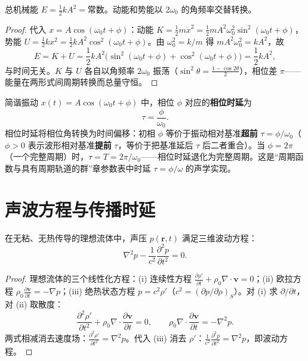 \begin{proposition}[简谐振动的能量守恒]\label{prop:harmonic_energy}
总机械能 $E = \frac{1}{2}kA^2 = \text{常数}$。动能和势能以 $2\omega_0$ 的角频率交替转换。
\end{proposition}

\begin{proof}
代入 $x = A\cos(\omega_0 t + \phi)$：动能 $K = \frac{1}{2}m\dot x^2 = \frac{1}{2}mA^2\omega_0^2\sin^2(\omega_0 t + \phi)$，势能 $U = \frac{1}{2}kx^2 = \frac{1}{2}kA^2\cos^2(\omega_0 t + \phi)$。由 $\omega_0^2 = k/m$ 得 $mA^2\omega_0^2 = kA^2$，故
\[
E = K + U = \frac{1}{2}kA^2\big(\sin^2(\omega_0 t + \phi) + \cos^2(\omega_0 t + \phi)\big) = \frac{1}{2}kA^2,
\]
与时间无关。$K$ 与 $U$ 各自以角频率 $2\omega_0$ 振荡（$\sin^2\theta = \frac{1-\cos 2\theta}{2}$），相位差 $\pi$——能量在两形式间周期转换而总量守恒。
\end{proof}

\begin{definition}[简谐振动的相位时延]\label{def:harmonic_phase_delay}
简谐振动 $x(t) = A\cos(\omega_0 t + \phi)$ 中，相位 $\phi$ 对应的\textbf{相位时延}为
\[
\tau = \frac{\phi}{\omega_0}.
\]
相位时延将相位角转换为时间偏移：初相 $\phi$ 等价于振动相对基准\textbf{超前} $\tau = \phi/\omega_0$（$\phi>0$ 表示波形相对基准\textbf{提前} $\tau$，等价于把基准延后 $\tau$ 后二者重合）。当 $\phi = 2\pi$（一个完整周期）时，$\tau = T = 2\pi/\omega_0$——相位时延退化为完整周期。这是“周期函数与具有周期轨道的群”章参数表中时延 $\tau = \phi/\omega$ 的声学实现。
\end{definition}

\section{声波方程与传播时延}

\begin{theorem}[声波方程]\label{thm:acoustic_wave_equation}
在无粘、无热传导的理想流体中，声压 $p(\mathbf{r}, t)$ 满足三维波动方程：
\[
\boxed{\nabla^2 p - \frac{1}{c^2} \frac{\partial^2 p}{\partial t^2} = 0}.
\]
\end{theorem}

\begin{proof}
理想流体的三个线性化方程：(i) 连续性方程 $\frac{\partial \rho'}{\partial t} + \rho_0 \nabla\cdot\mathbf{v} = 0$；(ii) 欧拉方程 $\rho_0 \frac{\partial \mathbf{v}}{\partial t} = -\nabla p$；(iii) 绝热状态方程 $p = c^2 \rho'$（$c^2 = (\partial p/\partial\rho)_S$）。对 (i) 求 $\partial/\partial t$，对 (ii) 取散度：
\[
\frac{\partial^2 \rho'}{\partial t^2} + \rho_0 \nabla\cdot\frac{\partial \mathbf{v}}{\partial t} = 0, \qquad
\rho_0 \nabla\cdot\frac{\partial \mathbf{v}}{\partial t} = -\nabla^2 p.
\]
两式相减消去速度场：$\frac{\partial^2 \rho'}{\partial t^2} = \nabla^2 p$。代入 (iii) 消去 $\rho'$：$\frac{1}{c^2}\frac{\partial^2 p}{\partial t^2} = \nabla^2 p$，即波动方程。
\end{proof}

